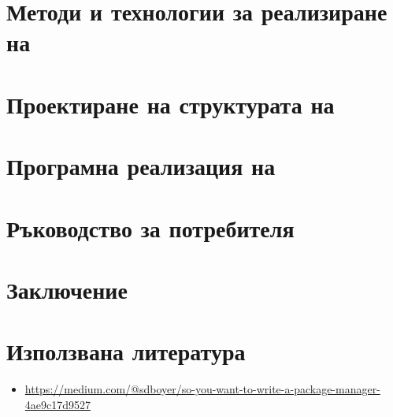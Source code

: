 \documentclass[14pt]{extreport}
\begin{document}


\chapter{Методи и технологии за реализиране на}



\chapter{Проектиране на структурата на}



\chapter{Програмна реализация на}



\chapter{Ръководство за потребителя}



\chapter*{Заключение}


\chapter{Използвана литература}

\begin{itemize}
  \item \url{https://medium.com/@sdboyer/so-you-want-to-write-a-package-manager-4ae9c17d9527}
\end{itemize}


\tableofcontents
\end{document}
